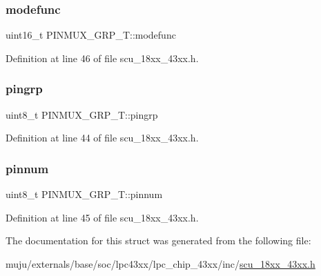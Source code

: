 \subsubsection{\texorpdfstring{modefunc}{modefunc}}
{\footnotesize\ttfamily uint16\+\_\+t P\+I\+N\+M\+U\+X\+\_\+\+G\+R\+P\+\_\+\+T\+::modefunc}



Definition at line 46 of file scu\+\_\+18xx\+\_\+43xx.\+h.

\mbox{\label{struct_p_i_n_m_u_x___g_r_p___t_affc1f31b35c2ebc6f7e9b6a4516eef80}} 
\subsubsection{\texorpdfstring{pingrp}{pingrp}}
{\footnotesize\ttfamily uint8\+\_\+t P\+I\+N\+M\+U\+X\+\_\+\+G\+R\+P\+\_\+\+T\+::pingrp}



Definition at line 44 of file scu\+\_\+18xx\+\_\+43xx.\+h.

\mbox{\label{struct_p_i_n_m_u_x___g_r_p___t_aba96fd28e625bd7e35b45c45131a337b}} 
\subsubsection{\texorpdfstring{pinnum}{pinnum}}
{\footnotesize\ttfamily uint8\+\_\+t P\+I\+N\+M\+U\+X\+\_\+\+G\+R\+P\+\_\+\+T\+::pinnum}



Definition at line 45 of file scu\+\_\+18xx\+\_\+43xx.\+h.



The documentation for this struct was generated from the following file\+:\begin{DoxyCompactItemize}
\item 
muju/externals/base/soc/lpc43xx/lpc\+\_\+chip\+\_\+43xx/inc/\hyperlink{scu__18xx__43xx_8h}{scu\+\_\+18xx\+\_\+43xx.\+h}\end{DoxyCompactItemize}
